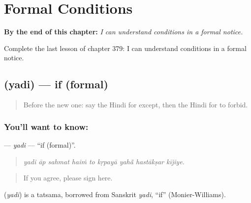 
\chapter{Formal Conditions}
\label{ch:hi-formal-conditions}

\begin{chapteropening}
\textbf{By the end of this chapter:} \emph{I can understand conditions in a formal notice.}

Complete the last lesson of chapter 379: I can understand conditions in a formal notice.
\end{chapteropening}

\section[\texorpdfstring{\hi{यदि} (yadi)}{यदि (yadi)}]{ (yadi) — if (formal)}

\label{lesson:HI-C379-yadi}



\begin{quote}
Before the new one: say the Hindi for except, then the Hindi for to forbid.
\end{quote}

\subsection*{You'll want to know: }
\textbf{} — \emph{yadi} — \textquotedblleft{}if (formal)\textquotedblright{}.

\begin{quote}
        
\end{quote}

\begin{quote}
\emph{yadi āp sahmat haiṁ to kṛpayā yahā̃ hastākṣar kījiye.}
\end{quote}

\begin{quote}
If you agree, please sign here.
\end{quote}

\begin{cousinweb}
\textbf{} (\emph{yadi}) is a tatsama, borrowed from Sanskrit \emph{yadi}, \textquotedblleft{}if\textquotedblright{} (Monier-Williams).
\end{cousinweb}

